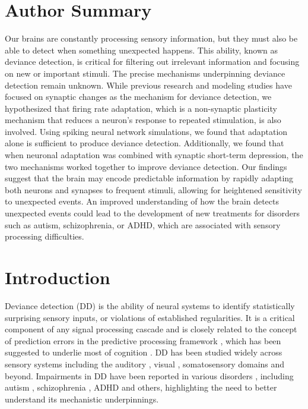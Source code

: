 \documentclass[9pt,lineno,onehalfspacing]{elife}
\begin{document}
\section{Author Summary}
Our brains are constantly processing sensory information, but they must also be able to detect when something unexpected happens. This ability, known as deviance detection, is critical for filtering out irrelevant information and focusing on new or important stimuli. The precise mechanisms underpinning deviance detection remain unknown. While previous research and modeling studies have focused on synaptic changes as the mechanism for deviance detection, we hypothesized that firing rate adaptation, which is a non-synaptic plasticity mechanism that reduces a neuron's response to repeated stimulation, is also involved. Using spiking neural network simulations, we found that adaptation alone is sufficient to produce deviance detection. Additionally, we found that when neuronal adaptation was combined with synaptic short-term depression, the two mechanisms worked together to improve deviance detection. Our findings suggest that the brain may encode predictable information by rapidly adapting both neurons and synapses to frequent stimuli, allowing for heightened sensitivity to unexpected events. An improved understanding of how the brain detects unexpected events could lead to the development of new treatments for disorders such as autism, schizophrenia, or ADHD, which are associated with sensory processing difficulties.


\section{Introduction}\label{sec:intro}

Deviance detection (DD) is the ability of neural systems to identify statistically surprising sensory inputs, or violations of established regularities. It is a critical component of any signal processing cascade and is closely related to the concept of prediction errors in the predictive processing framework \citep{Bendixen2012-nx, Khouri2015-gr, Carbajal2018-sd, Fong2020-em}, which has been suggested to underlie most of cognition \citep{Friston2005-jz, Clark2015-gl}. DD has been studied widely across sensory systems including the auditory \citep{Nelken2014-wr, Escera2014-tv, Carbajal2018-sd}, visual \citep{Winkler2012-pr, Pazo-Alvarez2003-kv}, somatosensory \citep{Naatanen2009-jx} domains and beyond. Impairments in DD have been reported in various disorders \citep{Fong2020-em}, including autism \citep{Schwartz2018-bc, Goris2018-bv, Hudac2018-jl, Vlaskamp2017-vs, Chen2020-lu}, schizophrenia \citep{Koshiyama2020-ca, Kim2020-fb, Salisbury2020-sd, Tada2019-lj}, ADHD \citep{Kim2021-uj, Hsieh2021-ti, Lee2020-np} and others, highlighting the need to better understand its mechanistic underpinnings.
\end{document}
